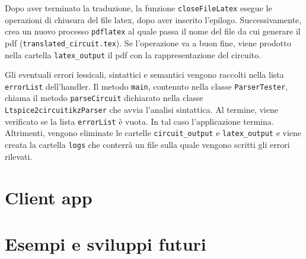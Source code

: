 Dopo aver terminato la traduzione, la funzione \texttt{closeFileLatex} esegue le operazioni di chiusura del file latex, dopo aver inserito l'epilogo. Successivamente, crea un nuovo processo \texttt{pdflatex} al quale passa il nome del file da cui generare il pdf (\texttt{translated\_circuit.tex}). Se l'operazione va a buon fine, viene prodotto nella cartella \texttt{latex\_output} il pdf con la rappresentazione del circuito.

\noindent
Gli eventuali errori lessicali, sintattici e semantici vengono raccolti nella lista \texttt{errorList} dell'handler. Il metodo \texttt{main}, contenuto nella classe \texttt{ParserTester}, chiama il metodo \texttt{parseCircuit} dichiarato nella classe \texttt{Ltspice2circuitikzParser} che avvia l'analisi sintattica. Al termine, viene verificato se la lista \texttt{errorList} è vuota. In tal caso l'applicazione termina. Altrimenti, vengono eliminate le cartelle \texttt{circuit\_output} e \texttt{latex\_output} e viene creata la cartella \texttt{logs} che conterrà un file sulla quale vengono scritti gli errori rilevati.

\section{Client app}

\section{Esempi e sviluppi futuri}
